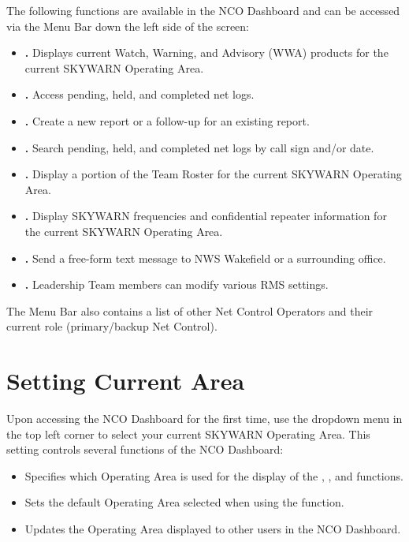 \documentclass[pdflatex,letterpaper,twoside,12pt]{book}
\begin{document}
The following functions are available in the NCO Dashboard and can be accessed via the Menu Bar down the left side of the screen:

\begin{itemize}
\item \textbf{.}  Displays current Watch, Warning, and Advisory (WWA) products for the current SKYWARN Operating Area.
\item \textbf{.}  Access pending, held, and completed net logs.
\item \textbf{.}  Create a new report or a follow-up for an existing report.
\item \textbf{.}  Search pending, held, and completed net logs by call sign and/or date.
\item \textbf{.}  Display a portion of the Team Roster for the current SKYWARN Operating Area.
\item \textbf{.}  Display SKYWARN frequencies and confidential repeater information for the current SKYWARN Operating Area.
\item \textbf{.}  Send a free-form text message to NWS Wakefield or a surrounding office.
\item \textbf{.}  Leadership Team members can modify various RMS settings.
\end{itemize}

The Menu Bar also contains a list of other Net Control Operators and their current role (primary/backup Net Control).


\section{Setting Current Area}\label{dash-set-area}

Upon accessing the NCO Dashboard for the first time, use the dropdown menu in the top left corner to select your current SKYWARN Operating Area.  This setting controls several functions of the NCO Dashboard:

\begin{itemize}
\item Specifies which Operating Area is used for the display of the , , and  functions.
\item Sets the default Operating Area selected when using the  function.
\item Updates the Operating Area displayed to other users in the NCO Dashboard.
\end{itemize}
\end{document}
